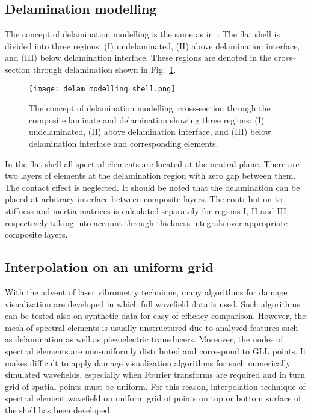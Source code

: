 \documentclass[preprint,12pt]{elsarticle}
\begin{document}
	\subsection{Delamination modelling \label{sec:delam_model}}
	The concept of delamination modelling is the same as in~\cite{Kudela2009}. The flat shell is divided into three regions: (I) undelaminated, (II) above delamination interface, and (III) below delamination interface. These regions are denoted in the cross--section through delamination shown in Fig.~\ref{fig:delam_modelling_shell}. 
	\begin{figure} [h!]
		\centering
		\texttt{[image: delam\_modelling\_shell.png]}	
		\caption{The concept of delamination modelling: cross-section through the composite laminate and delamination showing three regions: (I) undelaminated, (II) above delamination interface, and (III) below delamination interface and corresponding elements.}
		\label{fig:delam_modelling_shell}
	\end{figure}
	In the flat shell all spectral elements are located at the neutral plane. There are two layers of elements at the delamination region with zero gap between them. The contact effect is neglected. It should be noted that the delamination can be placed at arbitrary interface between composite layers. The contribution to stiffness and inertia matrices is calculated separately for regions I, II and III, respectively taking into account through thickness integrals over appropriate composite layers.
	\subsection{Interpolation on an uniform grid}
	With the advent of laser vibrometry technique, many algorithms for damage visualization  are developed in which full wavefield data is used. Such algorithms can be tested also on synthetic data for easy of efficacy comparison. However, the mesh of spectral elements is usually unstructured due to analysed features such as delamination as well as piezoelectric transducers. Moreover, the nodes of spectral elements are non-uniformly distributed and correspond to GLL points. It makes difficult to apply damage visualization algorithms for such numerically simulated wavefields, especially when Fourier transforms are required and in turn grid of spatial points must be uniform. For this reason, interpolation technique of spectral element wavefield on uniform grid of points on top or bottom surface of the shell has been developed. 
	
\end{document}
